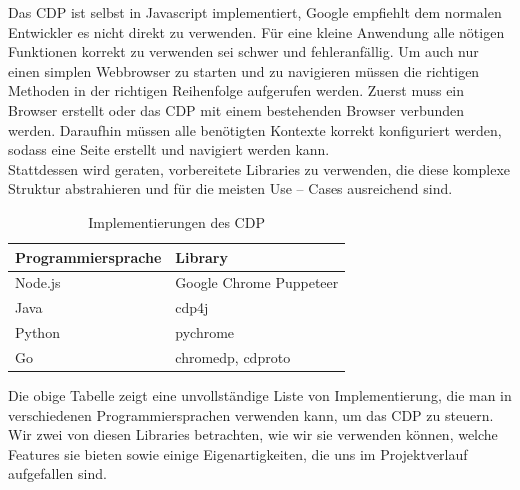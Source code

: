 Das \ac*{CDP} ist selbst in Javascript implementiert, Google empfiehlt dem normalen Entwickler es nicht direkt zu verwenden. \cite{dontuse} Für eine kleine Anwendung alle nötigen Funktionen korrekt zu verwenden sei schwer und fehleranfällig. Um auch nur einen simplen Webbrowser zu starten und zu navigieren müssen die richtigen Methoden in der richtigen Reihenfolge aufgerufen werden. Zuerst muss ein Browser erstellt oder das \ac{CDP} mit einem bestehenden Browser verbunden werden. Daraufhin müssen alle benötigten Kontexte korrekt konfiguriert werden, sodass eine Seite erstellt und navigiert werden kann. \\
Stattdessen wird geraten, vorbereitete Libraries zu verwenden, die diese komplexe Struktur abstrahieren und für die meisten Use – Cases ausreichend sind. 
\begin{table}[h]
	\centering
	\begin{tabu}{ll} \toprule
		Programmiersprache & Library \\ \midrule
		Node.js & Google Chrome Puppeteer \\
		Java & cdp4j \\
		Python & pychrome \\
		Go & chromedp, cdproto \\
		\bottomrule
	\end{tabu}
	\caption{Implementierungen des CDP}
	\label{scraper:table:cdpimpl}
\end{table}


Die obige Tabelle zeigt eine unvollständige Liste von Implementierung, die man in verschiedenen Programmiersprachen verwenden kann, um das CDP zu steuern. Wir zwei von diesen Libraries betrachten, wie wir sie verwenden können, welche Features sie bieten sowie einige Eigenartigkeiten, die uns im Projektverlauf aufgefallen sind.

